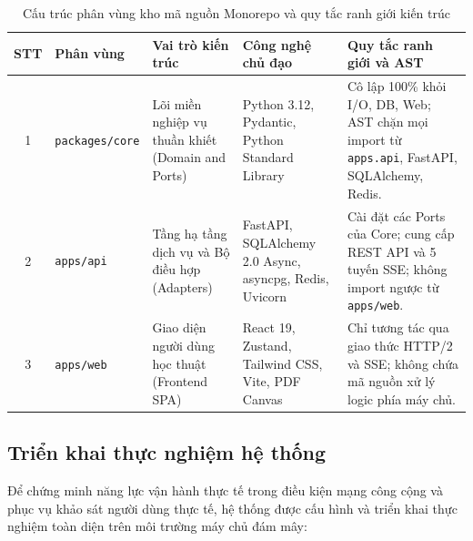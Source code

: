 \begin{table}[!htbp]
\centering
\renewcommand{\arraystretch}{1.20}
\caption{Cấu trúc phân vùng kho mã nguồn Monorepo và quy tắc ranh giới kiến trúc}
\label{tab:monorepo_structure}
\begin{tabularx}{\textwidth}{|c|>{\centering\arraybackslash}m{2.6cm}|>{\raggedright\arraybackslash}X|>{\raggedright\arraybackslash}X|>{\raggedright\arraybackslash}X|}
\hline
\textbf{STT} & \textbf{Phân vùng} & \centering\textbf{Vai trò kiến trúc} & \centering\textbf{Công nghệ chủ đạo} & \centering\textbf{Quy tắc ranh giới và AST} \tabularnewline \hline
1 & \texttt{packages/core} & Lõi miền nghiệp vụ thuần khiết (Domain and Ports) & Python 3.12, Pydantic, Python Standard Library & Cô lập 100\% khỏi I/O, DB, Web; AST chặn mọi import từ \texttt{apps.api}, FastAPI, SQLAlchemy, Redis. \\ \hline
2 & \texttt{apps/api} & Tầng hạ tầng dịch vụ và Bộ điều hợp (Adapters) & FastAPI, SQLAlchemy 2.0 Async, asyncpg, Redis, Uvicorn & Cài đặt các Ports của Core; cung cấp REST API và 5 tuyến SSE; không import ngược từ \texttt{apps/web}. \\ \hline
3 & \texttt{apps/web} & Giao diện người dùng học thuật (Frontend SPA) & React 19, Zustand, Tailwind CSS, Vite, PDF Canvas & Chỉ tương tác qua giao thức HTTP/2 và SSE; không chứa mã nguồn xử lý logic phía máy chủ. \\ \hline
\end{tabularx}
\end{table}

\subsection{Triển khai thực nghiệm hệ thống}
\label{subsec:trien_khai_thuc_nghiem}

Để chứng minh năng lực vận hành thực tế trong điều kiện mạng công cộng và phục vụ khảo sát người dùng thực tế, hệ thống \VS được cấu hình và triển khai thực nghiệm toàn diện trên môi trường máy chủ đám mây:

